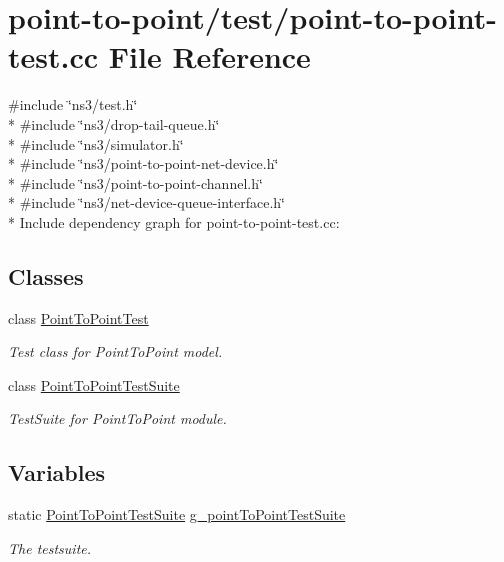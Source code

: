 \hypertarget{point-to-point-test_8cc}{}\section{point-\/to-\/point/test/point-\/to-\/point-\/test.cc File Reference}
\label{point-to-point-test_8cc}
{\ttfamily \#include \char`\"{}ns3/test.\+h\char`\"{}}\\*
{\ttfamily \#include \char`\"{}ns3/drop-\/tail-\/queue.\+h\char`\"{}}\\*
{\ttfamily \#include \char`\"{}ns3/simulator.\+h\char`\"{}}\\*
{\ttfamily \#include \char`\"{}ns3/point-\/to-\/point-\/net-\/device.\+h\char`\"{}}\\*
{\ttfamily \#include \char`\"{}ns3/point-\/to-\/point-\/channel.\+h\char`\"{}}\\*
{\ttfamily \#include \char`\"{}ns3/net-\/device-\/queue-\/interface.\+h\char`\"{}}\\*
Include dependency graph for point-\/to-\/point-\/test.cc\+:
\subsection*{Classes}
\begin{DoxyCompactItemize}
\item 
class \hyperlink{classPointToPointTest}{Point\+To\+Point\+Test}
\begin{DoxyCompactList}\small\item\em Test class for Point\+To\+Point model. \end{DoxyCompactList}\item 
class \hyperlink{classPointToPointTestSuite}{Point\+To\+Point\+Test\+Suite}
\begin{DoxyCompactList}\small\item\em Test\+Suite for Point\+To\+Point module. \end{DoxyCompactList}\end{DoxyCompactItemize}
\subsection*{Variables}
\begin{DoxyCompactItemize}
\item 
static \hyperlink{classPointToPointTestSuite}{Point\+To\+Point\+Test\+Suite} \hyperlink{point-to-point-test_8cc_adb5b98d86c7c2b925b4c87bc18203a3b}{g\+\_\+point\+To\+Point\+Test\+Suite}
\begin{DoxyCompactList}\small\item\em The testsuite. \end{DoxyCompactList}\end{DoxyCompactItemize}



